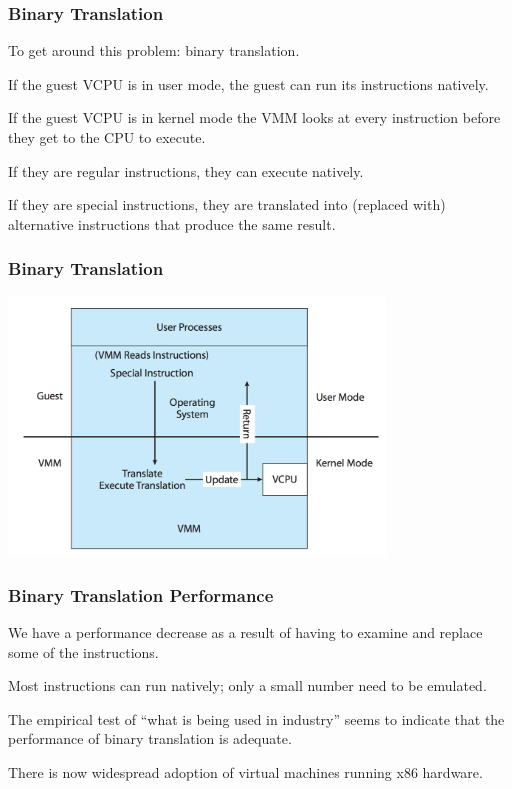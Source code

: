 \begin{frame}
\frametitle{Binary Translation}

To get around this problem: \alert{binary translation}. 

If the guest VCPU is in user mode, the guest can run its instructions natively. 

If the guest VCPU is in kernel mode the VMM looks at every instruction before they get to the CPU to execute. 

If they are regular instructions, they can execute natively. 

If they are special instructions, they are translated into (replaced with) alternative instructions that produce the same result.

\end{frame}

\begin{frame}
\frametitle{Binary Translation}

\begin{center}
	\includegraphics[width=0.75\textwidth]{images/binary-translation.png}
\end{center}


\end{frame}

\begin{frame}
\frametitle{Binary Translation Performance}

We have a performance decrease as a result of having to examine and replace some of the instructions. 

Most instructions can run natively; only a small number need to be emulated. 

The empirical test of ``what is being used in industry'' seems to indicate that the performance of binary translation is adequate. 

There is now widespread adoption of virtual machines running x86 hardware.


\end{frame}

